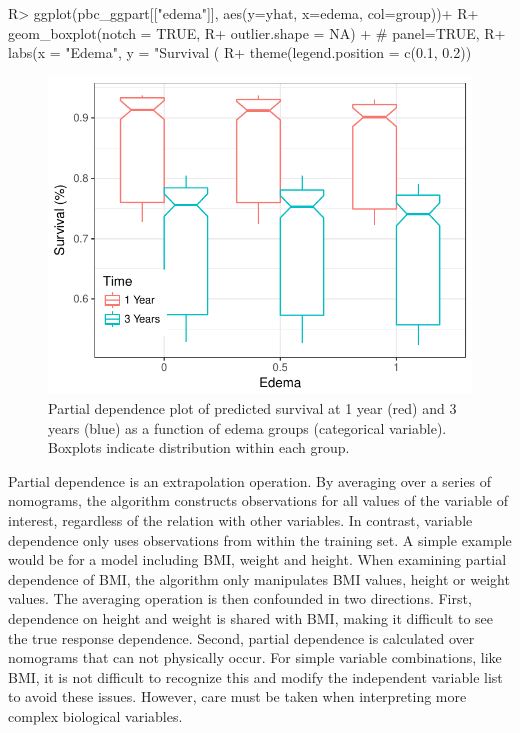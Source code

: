 \documentclass[article, nojss]{jss}
\begin{document}
\begin{Schunk}
\begin{Sinput}
R> ggplot(pbc_ggpart[["edema"]], aes(y=yhat, x=edema, col=group))+
R+   geom_boxplot(notch = TRUE,
R+                outlier.shape = NA) + # panel=TRUE,
R+   labs(x = "Edema", y = "Survival (%
R+   theme(legend.position = c(0.1, 0.2))
\end{Sinput}
\begin{figure}[!htb]

{\centering \includegraphics{rfs-pbc-partial-edema-1}

}

\caption[Partial dependence plot of predicted survival at 1 year (red) and 3 years (blue) as a function of edema groups (categorical variable)]{Partial dependence plot of predicted survival at 1 year (red) and 3 years (blue) as a function of edema groups (categorical variable). Boxplots indicate distribution within each group.}\label{fig:pbc-partial-edema}
\end{figure}
\end{Schunk}

Partial dependence is an extrapolation operation. By averaging over a
series of nomograms, the algorithm constructs observations for all
values of the variable of interest, regardless of the relation with
other variables. In contrast, variable dependence only uses observations
from within the training set. A simple example would be for a model
including BMI, weight and height. When examining partial dependence of
BMI, the algorithm only manipulates BMI values, height or weight values.
The averaging operation is then confounded in two directions. First,
dependence on height and weight is shared with BMI, making it difficult
to see the true response dependence. Second, partial dependence is
calculated over nomograms that can not physically occur. For simple
variable combinations, like BMI, it is not difficult to recognize this
and modify the independent variable list to avoid these issues. However,
care must be taken when interpreting more complex biological variables.
\end{document}
